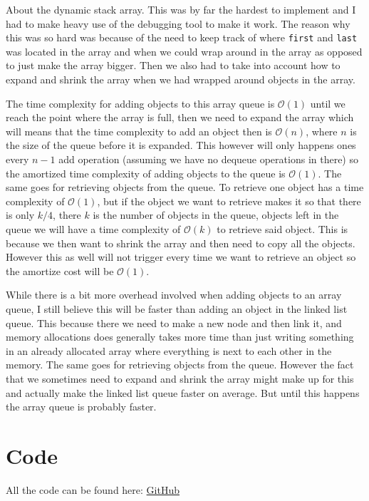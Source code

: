 \documentclass[a4paper,11pt]{article}
\begin{document}
About the dynamic stack array. This was by far the hardest to implement and I had to make heavy use of the debugging tool
to make it work. The reason why this was so hard was because of the need to keep track of where {\tt first} and {\tt last}
was located in the array and when we could wrap around in the array as opposed to just make the array bigger. Then we also
had to take into account how to expand and shrink the array when we had wrapped around objects in the array.

The time complexity for adding objects to this array queue is $\mathcal{O}(1)$ until we reach the point where the array
is full, then we need to expand the array which will means that the time complexity to add an object then is $\mathcal{O}(n)$,
where $n$ is the size of the queue before it is expanded. This however will only happens ones every $n-1$ add operation
(assuming we have no dequeue operations in there) so the amortized time complexity of adding objects to the queue is
${\mathcal{O}(1)}$. The same goes for retrieving objects from the queue. To retrieve one object has a time complexity
of $\mathcal{O}(1)$, but if the object we want to retrieve makes it so that there is only $k/4$, there $k$ is the number
of objects in the queue, objects left in the queue we will have a time complexity of $\mathcal{O}(k)$ to retrieve said
object. This is because we then want to shrink the array and then need to copy all the objects. However this as well
will not trigger every time we want to retrieve an object so the amortize cost will be $\mathcal{O}(1)$.

While there is a bit more overhead involved when adding objects to an array queue, I still believe this will be faster
than adding an object in the linked list queue. This because there we need to make a new node and then link it, and memory allocations does
generally takes more time than just writing something in an already allocated array where everything is next to each other
in the memory. The same goes for retrieving objects from the queue. However the fact that we sometimes need to expand and
shrink the array might make up for this and actually make the linked list queue faster on average. But until this happens
the array queue is probably faster.


\newpage
\FloatBarrier
\section*{Code}
All the code can be found here: \href{https://github.com/adrian-jonsson-sjoedin/ID1021-AlgoData/tree/main/Tasks/Queues/src}{GitHub}
\end{document}
